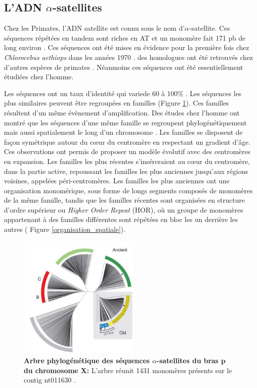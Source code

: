 \documentclass[12pt,a4paper]{article}
\begin{document}
\subsection{L'ADN $\alpha$-satellites}
Chez les Primates, l'ADN satellite  est connu sous le nom d'$\alpha$-satellite. Ces séquences répétées en tandem sont riches en AT et un monomère fait 171 pb de long environ \cite{Willard1991}. Ces séquences ont été mises en évidence pour la première fois chez \textit{Chlorocebus aethiops} dans les années 1970 \cite{Kurnit1974}. des homologues ont été retrouvés chez d’autres espèces de primates \cite{Lee1997}. Néanmoins ces séquences ont été essentiellement étudiées chez l’homme.

Les séquences ont un taux d’identité qui variede  60 à 100\% \cite{Alexandrov2001}. Les séquences les plus similaires peuvent être regroupées en familles (Figure \ref{shepelev}). Ces familles résultent d'un même évènement d'amplification. Des études chez l'homme ont montré que les séquences d'une même famille se regroupent phylogénétiquement mais aussi spatialement le long d'un chromosome \cite{Shepelev2009}. Les familles se disposent de façon symétrique autour du cœur du centromère en respectant un gradient d'âge.  Ces observations ont permis de proposer un modèle évolutif avec des centromères en expansion. Les familles les plus récentes s’inséreraient au cœur du centromère, dans la partie active, repoussant les familles les plus anciennes jusqu'aux régions voisines, appelées péri-centromères. Les familles les plus anciennes ont une organisation monomérique, sous forme de longs segments composés de monomères de la même famille, tandis que les familles récentes sont organisées en structure d'ordre supérieur ou \textit{Higher Order Repeat} (HOR), où un groupe de monomères appartenant à des familles différentes sont répétées en bloc les un derrière les autres ( Figure \ref{organisation_spatiale}).

\begin{figure}
	\center
		\includegraphics[height=6cm, width=6cm]{img/shepelev.png}
		\caption{\textbf{Arbre phylogénétique des séquences $\alpha$-satellites du bras p du chromosome X:} L’arbre réunit 1431 monomères présents sur le contig nt011630 \cite{Shepelev2009}.\label{shepelev}}
\end{figure}
\end{document}
